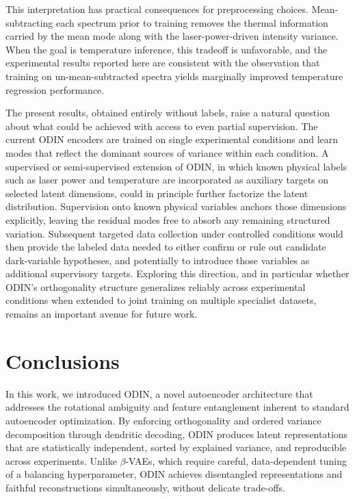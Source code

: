 \documentclass[twoside,11pt]{article}
\begin{document}
This interpretation has practical consequences for preprocessing choices. Mean-subtracting each spectrum prior to training removes the thermal information carried by the mean mode along with the laser-power-driven intensity variance. When the goal is temperature inference, this tradeoff is unfavorable, and the experimental results reported here are consistent with the observation that training on un-mean-subtracted spectra yields marginally improved temperature regression performance.

The present results, obtained entirely without labels, raise a natural question about what could be achieved with access to even partial supervision. The current ODIN encoders are trained on single experimental conditions and learn modes that reflect the dominant sources of variance within each condition. A supervised or semi-supervised extension of ODIN, in which known physical labels such as laser power and temperature are incorporated as auxiliary targets on selected latent dimensions, could in principle further factorize the latent distribution. Supervision onto known physical variables anchors those dimensions explicitly, leaving the residual modes free to absorb any remaining structured variation. Subsequent targeted data collection under controlled conditions would then provide the labeled data needed to either confirm or rule out candidate dark-variable hypotheses, and potentially to introduce those variables as additional supervisory targets. Exploring this direction, and in particular whether ODIN's orthogonality structure generalizes reliably across experimental conditions when extended to joint training on multiple specialist datasets, remains an important avenue for future work.


\section{Conclusions}

In this work, we introduced ODIN, a novel autoencoder architecture that addresses the rotational ambiguity and feature entanglement inherent to standard autoencoder optimization. By enforcing orthogonality and ordered variance decomposition through dendritic decoding, ODIN produces latent representations that are statistically independent, sorted by explained variance, and reproducible across experiments. Unlike $\beta$-VAEs, which require careful, data-dependent tuning of a balancing hyperparameter, ODIN achieves disentangled representations and faithful reconstructions simultaneously, without delicate trade-offs.
\end{document}
